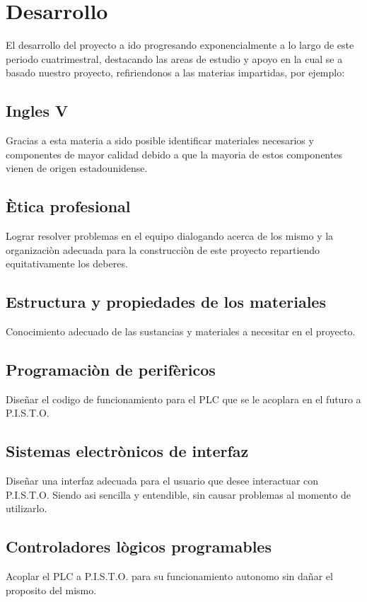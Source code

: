 \documentclass[12pt,a4paper]{report}
\begin{document}
\section{Desarrollo}
El desarrollo del proyecto a ido progresando exponencialmente a lo largo de este periodo cuatrimestral, destacando las areas de estudio y apoyo en la cual se a basado nuestro proyecto, refiriendonos a las materias impartidas, por ejemplo:

\subsection{Ingles V}
Gracias a esta materia a sido posible identificar materiales necesarios y componentes de mayor calidad debido a que la mayoria de estos componentes vienen de origen estadounidense.

\subsection{Ètica profesional}
Lograr resolver problemas en el equipo dialogando acerca de los mismo y la organizaciòn adecuada para la construcciòn de este proyecto repartiendo equitativamente los deberes.

\subsection{Estructura y propiedades de los materiales}
Conocimiento adecuado de las sustancias y materiales a necesitar en el proyecto.

\subsection{Programaciòn de perifèricos}
Diseñar el codigo de funcionamiento para el PLC que se le acoplara en el futuro a P.I.S.T.O.

\subsection{Sistemas electrònicos de interfaz}
Diseñar una interfaz adecuada para el usuario que desee interactuar con P.I.S.T.O. Siendo asi sencilla y entendible, sin causar problemas al momento de utilizarlo.

\subsection{Controladores lògicos programables}
Acoplar el PLC a P.I.S.T.O. para su funcionamiento autonomo sin dañar el proposito del mismo.\\
\end{document}
